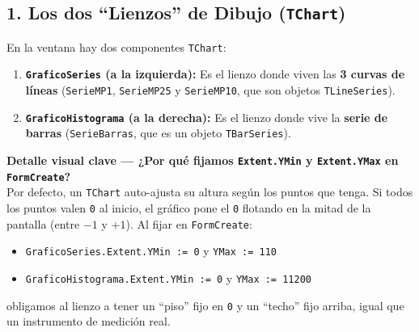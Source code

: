 \documentclass[11pt,a4paper]{article}
\begin{document}
\subsection{1. Los dos ``Lienzos'' de Dibujo (\texttt{TChart})}
En la ventana hay dos componentes \texttt{TChart}:
\begin{enumerate}[leftmargin=1.5em]
    \item \textbf{\texttt{GraficoSeries} (a la izquierda):} Es el lienzo donde viven las \textbf{3 curvas de líneas} (\texttt{SerieMP1}, \texttt{SerieMP25} y \texttt{SerieMP10}, que son objetos \texttt{TLineSeries}).
    \item \textbf{\texttt{GraficoHistograma} (a la derecha):} Es el lienzo donde vive la \textbf{serie de barras} (\texttt{SerieBarras}, que es un objeto \texttt{TBarSeries}).
\end{enumerate}

\textbf{Detalle visual clave --- ¿Por qué fijamos \texttt{Extent.YMin} y \texttt{Extent.YMax} en \texttt{FormCreate}?}\\
Por defecto, un \texttt{TChart} auto-ajusta su altura según los puntos que tenga. Si todos los puntos valen \texttt{0} al inicio, el gráfico pone el \texttt{0} flotando en la mitad de la pantalla (entre $-1$ y $+1$). Al fijar en \texttt{FormCreate}:
\begin{itemize}
    \item \texttt{GraficoSeries.Extent.YMin := 0} y \texttt{YMax := 110}
    \item \texttt{GraficoHistograma.Extent.YMin := 0} y \texttt{YMax := 11200}
\end{itemize}
obligamos al lienzo a tener un ``piso'' fijo en \texttt{0} y un ``techo'' fijo arriba, igual que un instrumento de medición real.
\end{document}
